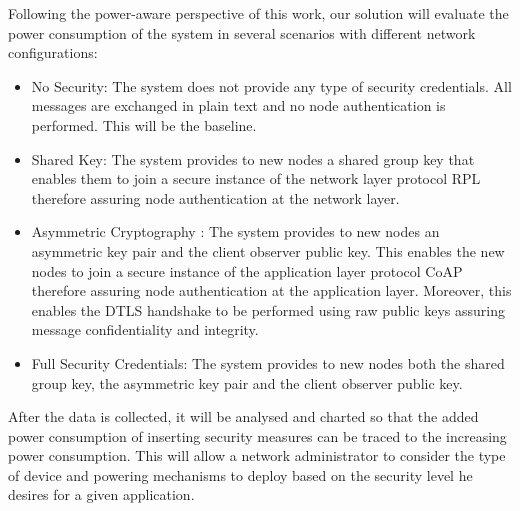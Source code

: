 Following the power-aware perspective of this work, our solution will evaluate the power consumption of the system in several scenarios with different network configurations:

\begin{itemize}
	\item No Security: The system does not provide any type of security credentials. All messages are exchanged in plain text and no node authentication is performed. This will be the baseline.
	\item Shared Key: The system provides to new nodes a shared group key that enables them to join a secure instance of the network layer protocol RPL therefore assuring node authentication at the network layer.
	\item Asymmetric Cryptography : The system provides to new nodes an asymmetric key pair and the client observer public key. This enables the new nodes to join a secure instance of the application layer protocol \ac{CoAP} therefore assuring node authentication at the application layer. Moreover, this enables the \ac{DTLS} handshake to be performed using raw public keys assuring message confidentiality and integrity.
	\item Full Security Credentials: The system provides to new nodes both the shared group key, the asymmetric key pair and the client observer public key. 
\end{itemize}

After the data is collected, it will be analysed and charted so that the added power consumption of inserting security measures can be traced to the increasing power consumption. This will allow a network administrator to consider the type of device and powering mechanisms to deploy based on the security level he desires for a given application.